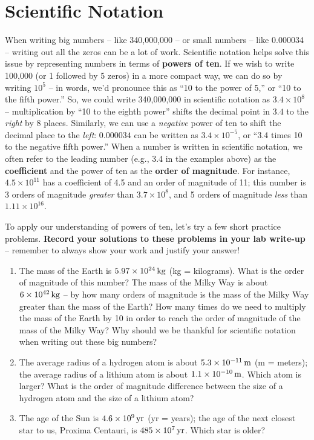 \documentclass[11pt]{article}
\begin{document}
\section{Scientific Notation}
When writing big numbers -- like 340,000,000 -- or small numbers -- like 0.000034 -- writing out all the zeros can be a lot of work. Scientific notation helps solve this issue by representing numbers in terms of \textbf{powers of ten}. If we wish to write 100,000 (or 1 followed by 5 zeros) in a more compact way, we can do so by writing $10^5$ -- in words, we'd pronounce this as ``10 to the power of 5,'' or ``10 to the fifth power.'' So, we could write 340,000,000 in scientific notation as $3.4 \times 10^8$ -- multiplication by ``10 to the eighth power'' shifts the decimal point in $3.4$ to the \emph{right} by 8 places. Similarly, we can use a \emph{negative} power of ten to shift the decimal place to the \emph{left}: $0.000034$ can be written as $3.4 \times 10^{-5}$, or ``3.4 times 10 to the negative fifth power.'' When a number is written in scientific notation, we often refer to the leading number (e.g., 3.4 in the examples above) as the \textbf{coefficient} and the power of ten as the \textbf{order of magnitude}. For instance, $4.5 \times 10^{11}$ has a coefficient of 4.5 and an order of magnitude of 11; this number is 3 orders of magnitude \emph{greater} than $3.7 \times 10^8$, and 5 orders of magnitude \emph{less} than $1.11 \times 10^{16}$.

\bigskip

To apply our understanding of powers of ten, let's try a few short practice problems. \textbf{Record your solutions to these problems in your lab write-up} -- remember to always show your work and justify your answer!
\begin{enumerate}
    \item The mass of the Earth is $5.97 \times 10^{24} \, {\rm kg}$ (kg = kilograms). What is the order of magnitude of this number? The mass of the Milky Way is about $6 \times 10^{42} \, {\rm kg}$ -- by how many orders of magnitude is the mass of the Milky Way greater than the mass of the Earth? How many times do we need to multiply the mass of the Earth by 10 in order to reach the order of magnitude of the mass of the Milky Way? Why should we be thankful for scientific notation when writing out these big numbers?
    
    \item The average radius of a hydrogen atom is about $5.3 \times 10^{-11} \, {\rm m}$ (m = meters); the average radius of a lithium atom is about $1.1 \times 10^{-10} \, {\rm m}$. Which atom is larger? What is the order of magnitude difference between the size of a hydrogen atom and the size of a lithium atom? 
    
    \item The age of the Sun is $4.6 \times 10^9 \, {\rm yr}$ (yr = years); the age of the next closest star to us, Proxima Centauri, is $485 \times 10^{7} \, {\rm yr}$. Which star is older? 
\end{enumerate}
\end{document}
